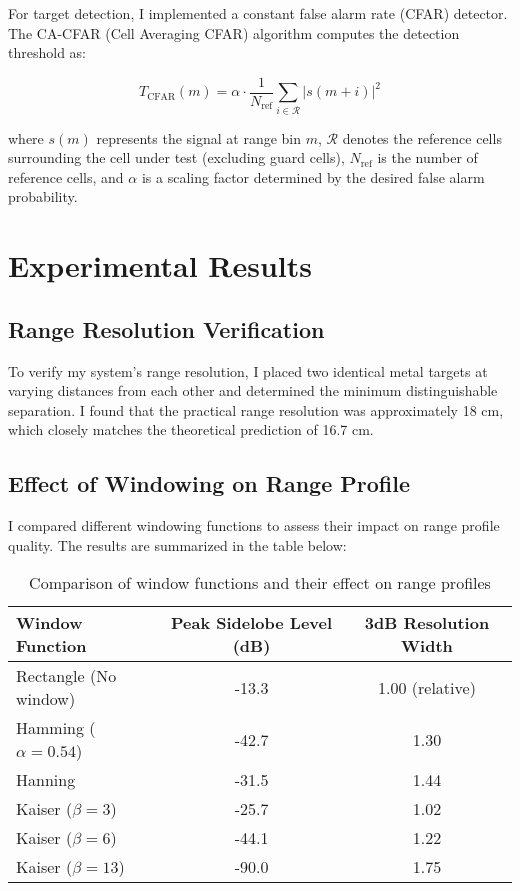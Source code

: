\documentclass[11pt,a4paper]{article}
\begin{document}
For target detection, I implemented a constant false alarm rate (CFAR) detector. The CA-CFAR (Cell Averaging CFAR) algorithm computes the detection threshold as:

\begin{equation}
T_{\text{CFAR}}(m) = \alpha \cdot \frac{1}{N_{\text{ref}}} \sum_{i \in \mathcal{R}} |s(m+i)|^2
\end{equation}

where $s(m)$ represents the signal at range bin $m$, $\mathcal{R}$ denotes the reference cells surrounding the cell under test (excluding guard cells), $N_{\text{ref}}$ is the number of reference cells, and $\alpha$ is a scaling factor determined by the desired false alarm probability.

\section{Experimental Results}

\subsection{Range Resolution Verification}

To verify my system's range resolution, I placed two identical metal targets at varying distances from each other and determined the minimum distinguishable separation. I found that the practical range resolution was approximately 18 cm, which closely matches the theoretical prediction of 16.7 cm.

\subsection{Effect of Windowing on Range Profile}

I compared different windowing functions to assess their impact on range profile quality. The results are summarized in the table below:

\begin{table}[h]
\centering
\begin{tabular}{|l|c|c|}
\hline
\textbf{Window Function} & \textbf{Peak Sidelobe Level (dB)} & \textbf{3dB Resolution Width} \\
\hline
Rectangle (No window) & -13.3 & 1.00 (relative) \\
Hamming ($\alpha = 0.54$) & -42.7 & 1.30 \\
Hanning & -31.5 & 1.44 \\
Kaiser ($\beta = 3$) & -25.7 & 1.02 \\
Kaiser ($\beta = 6$) & -44.1 & 1.22 \\
Kaiser ($\beta = 13$) & -90.0 & 1.75 \\
\hline
\end{tabular}
\caption{Comparison of window functions and their effect on range profiles}
\end{table}
\end{document}
